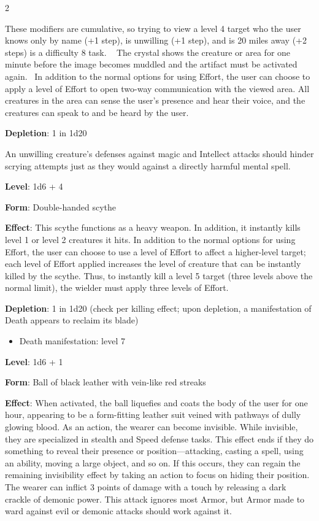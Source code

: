 \begin{multicols}{2}

These modifiers are cumulative, so trying to view a level 4 target who the user knows only by name (+1 step), is unwilling (+1 step), and is 20 miles away (+2 steps) is a difficulty 8 task.
 
The crystal shows the creature or area for one minute before the image becomes muddled and the artifact must be activated again. 
In addition to the normal options for using Effort, the user can choose to apply a level of Effort to open two-way communication with the viewed area. All creatures in the area can sense the user’s presence and hear their voice, and the creatures can speak to and be heard by the user. 

\textbf{Depletion}: 1 in 1d20

An unwilling creature’s defenses against magic and Intellect attacks should hinder scrying attempts just as they would against a directly harmful mental spell.


\textbf{Level}: 1d6 + 4 

\textbf{Form}: Double-handed scythe 

\textbf{Effect}: This scythe functions as a heavy weapon. In addition, it instantly kills level 1 or level 2 creatures it hits. In addition to the normal options for using Effort, the user can choose to use a level of Effort to affect a higher-level target; each level of Effort applied increases the level of creature that can be instantly killed by the scythe. Thus, to instantly kill a level 5 target (three levels above the normal limit), the wielder must apply three levels of Effort. 

\textbf{Depletion}: 1 in 1d20 (check per killing effect; upon depletion, a manifestation of Death appears to reclaim its blade)

\begin{itemize}	
\item Death manifestation: level 7
\end{itemize}


\textbf{Level}: 1d6 + 1 

\textbf{Form}: Ball of black leather with vein-like red streaks 

\textbf{Effect}: When activated, the ball liquefies and coats the body of the user for one hour, appearing to be a form-fitting leather suit veined with pathways of dully glowing blood. As an action, the wearer can become invisible. While invisible, they are specialized in stealth and Speed defense tasks. This effect ends if they do something to reveal their presence or position—attacking, casting a spell, using an ability, moving a large object, and so on. If this occurs, they can regain the remaining invisibility effect by taking an action to focus on hiding their position. The wearer can inflict 3 points of damage with a touch by releasing a dark crackle of demonic power. This attack ignores most Armor, but Armor made to ward against evil or demonic attacks should work against it. 


\end{multicols}
